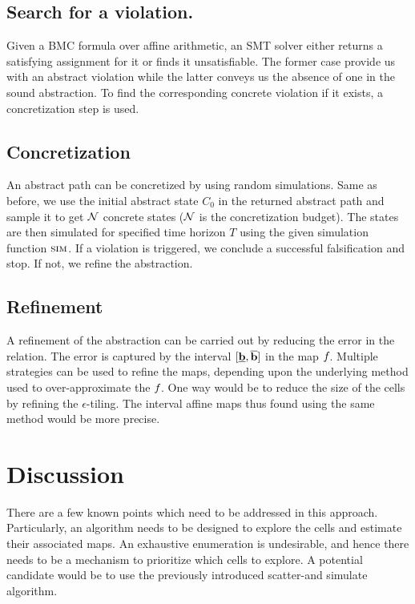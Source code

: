 \subsection{Search for a violation.} Given a BMC formula over affine
arithmetic, an SMT solver either returns a satisfying assignment for
it or finds it unsatisfiable. The former case provide us with an
abstract violation while the latter conveys us the absence of one in
the sound abstraction. To find the corresponding concrete violation if
it exists, a concretization step is used.

\subsection{Concretization} An abstract path can be concretized by
using random simulations. Same as before, we use the initial abstract
state $C_0$ in the returned abstract path and sample it to get
$\mathcal{N}$ concrete states ($\mathcal{N}$ is the concretization budget).
The states are then simulated for specified time horizon $T$ using the
given simulation function $\mbox{\sc sim}$. If a violation is triggered, we
conclude a successful falsification and stop. If not, we refine the
abstraction.

\subsection{Refinement} A refinement of the abstraction can be carried
out by reducing the error in the relation. The error is captured by
the interval $[\underline{\mathbf{b}}, \overline{\mathbf{b}}]$ in the map $f_{}$.
Multiple strategies can be used to refine the maps, depending upon the
underlying method used to over-approximate the $f_{}$. One way would
be to reduce the size of the cells by refining the $\epsilon$-tiling.
The interval affine maps thus found using the same method would be
more precise.

\section{Discussion}

There are a few known points which need to be addressed in this
approach. Particularly, an algorithm needs to be designed to explore
the cells and estimate their associated maps. An exhaustive
enumeration is undesirable, and hence there needs to be a mechanism to
prioritize which cells to explore. A potential candidate would be to
use the previously introduced scatter-and simulate algorithm.


